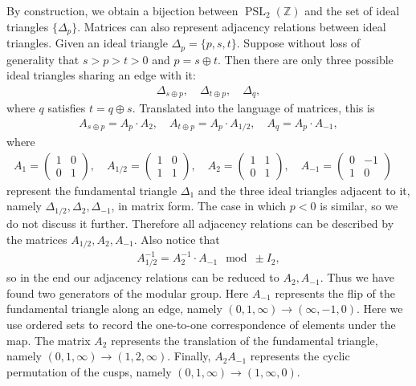 \documentclass[10pt, a4paper]{article}
\newcommand{\Z}{\mathbb{Z}}
\newcommand{\PSL}{\operatorname{PSL}_2(\Z)}
\theoremstyle{definition}
\theoremstyle{remark}
\begin{document}
By construction, we obtain a bijection between \(\PSL\) and the set of ideal triangles \(\{\Delta_p\}\). Matrices can also represent adjacency relations between ideal triangles.
Given an ideal triangle \(\Delta_p =\{p,s,t\}\). Suppose without loss of generality that \(s>p>t>0\) and \(p=s\oplus t\). Then there are only three possible ideal triangles sharing an edge with it:
\begin{align*}
    \Delta_{s\oplus p},\quad \Delta_{t\oplus p},\quad \Delta_q,
\end{align*}
where \(q\) satisfies \(t=q\oplus s\). Translated into the language of matrices, this is
\begin{align*}
    A_{s\oplus p} =  A_p\cdot A_2, \quad  A_{t\oplus p} = A_p\cdot A_{1/2},\quad A_q = A_p\cdot A_{-1},
\end{align*}
where
\begin{align*}
    A_1 = \begin{pmatrix} 1 & 0 \\ 0 & 1 \end{pmatrix},\quad 
    A_{1/2} = \begin{pmatrix} 1 & 0 \\ 1 & 1 \end{pmatrix},\quad
    A_{2} = \begin{pmatrix} 1 & 1 \\ 0 & 1 \end{pmatrix},\quad
    A_{-1} = \begin{pmatrix} 0 & -1 \\ 1 & 0 \end{pmatrix}\quad
\end{align*}
represent the fundamental triangle \(\Delta_1\) and the three ideal triangles adjacent to it, namely \(\Delta_{1/2},\Delta_{2},\Delta_{-1}\), in matrix form. The case in which \(p<0\) is similar, so we do not discuss it further.
Therefore all adjacency relations can be described by the matrices \(A_{1/2},A_{2},A_{-1}\).
Also notice that
\begin{align*}
    A^{-1}_{1/2} = A^{-1}_2\cdot A_{-1} \mod \pm I_2, 
\end{align*}
so in the end our adjacency relations can be reduced to \(A_2,A_{-1}\). Thus we have found two generators of the modular group. Here \(A_{-1}\) represents the flip of the fundamental triangle along an edge, namely \((0,1,\infty)\to (\infty,-1,0)\). Here we use ordered sets to record the one-to-one correspondence of elements under the map.
The matrix \(A_2\) represents the translation of the fundamental triangle, namely \((0,1,\infty)\to (1,2,\infty)\). Finally, \(A_2A_{-1}\) represents the cyclic permutation of the cusps, namely \((0,1,\infty)\to (1,\infty,0)\).
\end{document}
